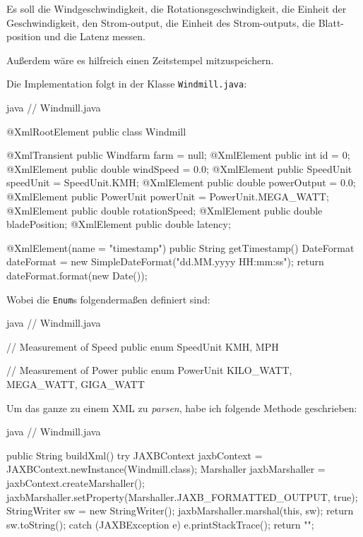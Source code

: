 Es soll die Windgeschwindigkeit, die Rotationsgeschwindigkeit, die Einheit der Geschwindigkeit, den Strom-output, die Einheit des Strom-outputs, die Blatt-position und die Latenz messen.

Außerdem wäre es hilfreich einen Zeitstempel mitzuspeichern.

Die Implementation folgt in der Klasse \texttt{Windmill.java}:

\begin{code}{java}
// Windmill.java

@XmlRootElement
public class Windmill {
    @XmlTransient
    public Windfarm farm = null;
    @XmlElement
    public int id = 0;
    @XmlElement
    public double windSpeed = 0.0;
    @XmlElement
    public SpeedUnit speedUnit = SpeedUnit.KMH;
    @XmlElement
    public double powerOutput = 0.0;
    @XmlElement
    public PowerUnit powerUnit = PowerUnit.MEGA_WATT;
    @XmlElement
    public double rotationSpeed;
    @XmlElement
    public double bladePosition;
    @XmlElement
    public double latency;

    @XmlElement(name = "timestamp")
    public String getTimestamp() {
        DateFormat dateFormat = new SimpleDateFormat("dd.MM.yyyy HH:mm:ss");
        return dateFormat.format(new Date());
    }
}
\end{code}

Wobei die \texttt{Enum}s folgendermaßen definiert sind:

\begin{code}{java}
// Windmill.java

// Measurement of Speed
public enum SpeedUnit {
    KMH,
    MPH
}

// Measurement of Power
public enum PowerUnit {
    KILO_WATT,
    MEGA_WATT,
    GIGA_WATT
}
\end{code}

Um das ganze zu einem XML zu \textit{parsen}, habe ich folgende Methode geschrieben:

\begin{code}{java}
    // Windmill.java

    public String buildXml() {
        try {
            JAXBContext jaxbContext = JAXBContext.newInstance(Windmill.class);
            Marshaller jaxbMarshaller = jaxbContext.createMarshaller();
            jaxbMarshaller.setProperty(Marshaller.JAXB_FORMATTED_OUTPUT, true);
            StringWriter sw = new StringWriter();
            jaxbMarshaller.marshal(this, sw);
            return sw.toString();
        } catch (JAXBException e) {
            e.printStackTrace();
            return "";
        }
    }
\end{code}

